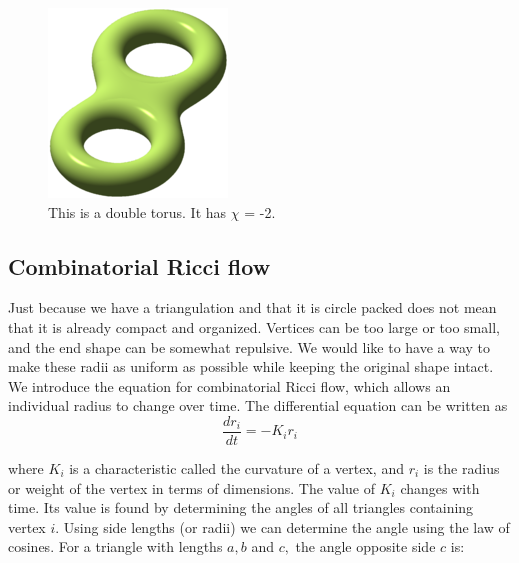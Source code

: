 \documentclass[12pt]{article}
\begin{document}
\begin{figure}
\includegraphics{180px-Double_torus_illustration.png}
\caption{This is a double torus. It has $\chi$ = -2.}
\end{figure}

%  
  \subsection{Combinatorial Ricci flow}
  \maketitle  
Just because we have a triangulation and that it is circle packed does not mean that it is already compact and organized. Vertices can be too large or too small, and the end shape can be somewhat repulsive. We would like to have a way to make these radii as uniform as possible while keeping the original shape intact. We introduce the equation for combinatorial Ricci flow, which allows an individual radius to change over time. The differential equation can be written as 
  \begin{equation}
  \frac{dr_i}{{dt}} = -K_ir_i
  \end{equation}
  
\noindent where $K_i$ is a characteristic called the curvature of a vertex, and $r_i$ is the radius or weight of the vertex in terms of dimensions. The value of $K_i$ changes with time. Its value is found by determining the angles of all triangles containing vertex $i$. Using side lengths (or radii) we can determine the angle using the law of cosines. For a triangle with lengths $a, b$ and $c,$ the angle opposite side $c$ is:
  
\end{document}
